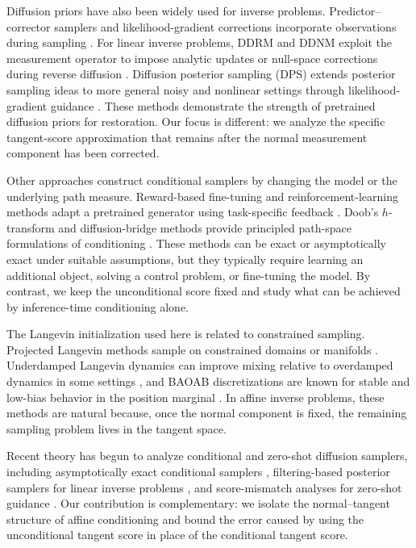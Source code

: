 \documentclass[twoside,11pt]{article}
\numberwithin{equation}{section}
\begin{document}
Diffusion priors have also been widely used for inverse problems. Predictor--
corrector samplers and likelihood-gradient corrections incorporate observations
during sampling \citep{song2021scorebased, song2022medinv}. For linear inverse
problems, DDRM and DDNM exploit the measurement operator to impose analytic
updates or null-space corrections during reverse diffusion
\citep{kawar2022ddrm, wang2022ddnm}. Diffusion posterior sampling (DPS) extends posterior sampling ideas to
more general noisy and nonlinear settings through likelihood-gradient guidance
\citep{chung2023dps}. These methods demonstrate the strength of pretrained
diffusion priors for restoration. Our focus is different: we analyze the
specific tangent-score approximation that remains after the normal measurement
component has been corrected.

Other approaches construct conditional samplers by changing the model or the
underlying path measure. Reward-based fine-tuning and reinforcement-learning
methods adapt a pretrained generator using task-specific feedback
\citep{fan2023dpok,zhao2025ctrl,uehara2024understanding}. Doob's
\(h\)-transform and diffusion-bridge methods provide principled path-space
formulations of conditioning
\citep{didi2023framework,guo2026hardconstraint,zhou2024ddbm}. These methods can
be exact or asymptotically exact under suitable assumptions, but they typically
require learning an additional object, solving a control problem, or fine-tuning
the model. By contrast, we keep the unconditional score fixed and study what can
be achieved by inference-time conditioning alone.

The Langevin initialization used here is related to constrained sampling.
Projected Langevin methods sample on constrained domains or manifolds
\citep{lamperski2021projected}. Underdamped Langevin dynamics can improve
mixing relative to overdamped dynamics in some settings
\citep{cheng2018underdamped}, and BAOAB discretizations are known for stable
and low-bias behavior in the position marginal
\citep{leimkuhler2013rational}. In affine inverse problems, these methods are
natural because, once the normal component is fixed, the remaining sampling
problem lives in the tangent space.

Recent theory has begun to analyze conditional and zero-shot diffusion samplers,
including asymptotically exact conditional samplers \citep{wu2023tds},
filtering-based posterior samplers for linear inverse problems
\citep{dou2024diffusion}, and score-mismatch analyses for zero-shot guidance
\citep{liang2025theory}. Our contribution is complementary: we isolate the
normal--tangent structure of affine conditioning and bound the error caused by
using the unconditional tangent score in place of the conditional tangent score.
\end{document}
